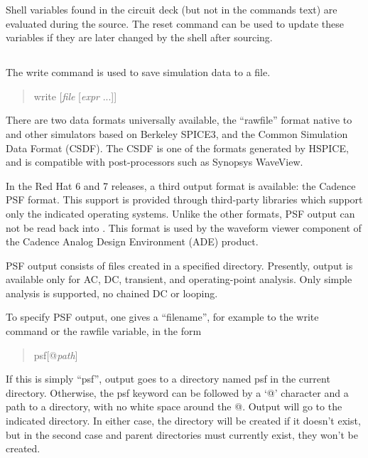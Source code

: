 Shell variables found in the circuit deck (but not in the
commands text) are evaluated during the source.  The {\cb reset}
command can be used to update these variables if they are later
changed by the shell after sourcing. 

\subsection{}
\label{writecmd}


The {\cb write} command is used to save simulation data to a file.
\begin{quote}\vt
write [{\it file} [{\it expr} ...]]
\end{quote}
There are two data formats universally available, the ``rawfile''
format native to {\WRspice} and other simulators based on Berkeley
SPICE3, and the Common Simulation Data Format (CSDF).  The CSDF is one
of the formats generated by HSPICE, and is compatible with
post-processors such as Synopsys WaveView.

In the Red Hat 6 and 7 releases, a third output format is available: 
the Cadence PSF format.  This support is provided through third-party
libraries which support only the indicated operating systems.  Unlike
the other formats, PSF output can not be read back into {\WRspice}. 
This format is used by the waveform viewer component of the Cadence
Analog Design Environment (ADE) product.

PSF output consists of files created in a specified directory. 
Presently, output is available only for AC, DC, transient, and
operating-point analysis.  Only simple analysis is supported, no
chained DC or looping.

To specify PSF output, one gives a ``filename'', for example to the
{\cb write} command or the {\vt rawfile} variable, in the form

\begin{quote}
{\vt psf}[{\vt @}{\it path\/}]
\end{quote}

If this is simply ``{\vt psf}'', output goes to a directory named {\vt
psf} in the current directory.  Otherwise, the {\vt psf} keyword can
be followed by a `{\vt @}' character and a path to a directory, with
no white space around the {\vt @}.  Output will go to the indicated
directory.  In either case, the directory will be created if it
doesn't exist, but in the second case and parent directories must
currently exist, they won't be created.

